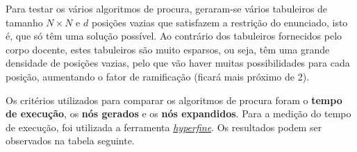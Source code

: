 \documentclass[12pt,a4paper]{article}
\begin{document}
Para testar os vários algoritmos de procura, geraram-se vários tabuleiros de tamanho \(N \times N\)
e \(d\) posições vazias que satisfazem a restrição do enunciado, isto é, que só têm uma solução possível.
Ao contrário dos tabuleiros fornecidos pelo corpo docente, estes tabuleiros são muito
esparsos, ou seja, têm uma grande densidade de posições vazias, pelo que vão haver muitas
possibilidades para cada posição, aumentando o fator de ramificação (ficará mais próximo de 2).

Os critérios utilizados para comparar os algoritmos de procura foram o \textbf{tempo de execução},
os \textbf{nós gerados} e os \textbf{nós expandidos}.
Para a medição do tempo de execução, foi utilizada a ferramenta \href{https://github.com/sharkdp/hyperfine}{\textit{hyperfine}}.
Os resultados podem ser observados na tabela seguinte.

\vspace{0.5cm}
\end{document}

